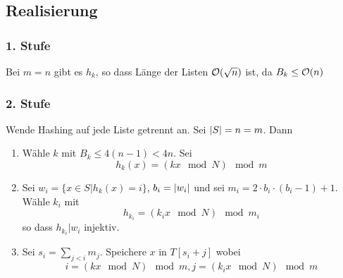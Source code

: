             \subsection{Realisierung}
                \subsubsection{1. Stufe}
                    Bei $m=n$ gibt es $h_k$, so dass Länge der Listen $\mathcal{O}(\sqrt{n})$ ist, da $B_k \leq \mathcal{O}(n)$
                    
                \subsubsection{2. Stufe}
                    Wende Hashing auf jede Liste getrennt an. Sei $\lvert S\rvert = n = m$. Dann
                    \begin{enumerate}
                        \item Wähle $k$ mit $B_k \leq 4(n-1) < 4n$. Sei 
                            $$
                                h_k(x) = (kx \mod N) \mod m
                            $$
                        \item Sei $w_i = \{ x \in S | h_k(x) = i \}$, $b_i = \lvert w_i\rvert$ und sei $m_i = 2 \cdot b_i \cdot (b_i -1) +1 $. Wähle $k_i$ mit 
                            $$
                                h_{k_i} = (k_ix \mod N) \mod m_i
                            $$
                            so dass $h_{k_i}|w_i$ injektiv.
                        \item Sei $s_i = \sum_{j<i}{m_j}$. Speichere $x$ in $T[s_i + j]$ wobei 
                            $$
                                i = (kx \mod N) \mod m, j = (k_ix \mod N) \mod m
                            $$
                    \end{enumerate}
